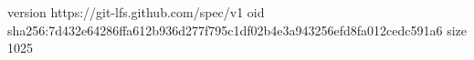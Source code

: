 version https://git-lfs.github.com/spec/v1
oid sha256:7d432e64286ffa612b936d277f795c1df02b4e3a943256efd8fa012cedc591a6
size 1025
